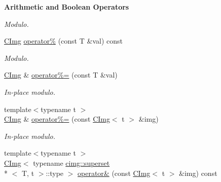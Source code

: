 \begin{Indent}{\bf Arithmetic and Boolean Operators}
\begin{DoxyCompactItemize}
\begin{DoxyCompactList}\small\item\em Modulo. \end{DoxyCompactList}\item 
\hypertarget{structcimg__library_1_1_c_img_aafbc4f1ab811546a85364618608eebfc}{\hyperlink{structcimg__library_1_1_c_img}{C\-Img} \hyperlink{structcimg__library_1_1_c_img_aafbc4f1ab811546a85364618608eebfc}{operator\%} (const T \&val) const }\label{structcimg__library_1_1_c_img_aafbc4f1ab811546a85364618608eebfc}

\begin{DoxyCompactList}\small\item\em Modulo. \end{DoxyCompactList}\item 
\hypertarget{structcimg__library_1_1_c_img_ac44cf1f894565de9abc1cc4b9c079d81}{\hyperlink{structcimg__library_1_1_c_img}{C\-Img} \& \hyperlink{structcimg__library_1_1_c_img_ac44cf1f894565de9abc1cc4b9c079d81}{operator\%=} (const T \&val)}\label{structcimg__library_1_1_c_img_ac44cf1f894565de9abc1cc4b9c079d81}

\begin{DoxyCompactList}\small\item\em In-\/place modulo. \end{DoxyCompactList}\item 
\hypertarget{structcimg__library_1_1_c_img_a5e695c9e7d106d52be64f935942c0d8c}{{\footnotesize template$<$typename t $>$ }\\\hyperlink{structcimg__library_1_1_c_img}{C\-Img} \& \hyperlink{structcimg__library_1_1_c_img_a5e695c9e7d106d52be64f935942c0d8c}{operator\%=} (const \hyperlink{structcimg__library_1_1_c_img}{C\-Img}$<$ t $>$ \&img)}\label{structcimg__library_1_1_c_img_a5e695c9e7d106d52be64f935942c0d8c}

\begin{DoxyCompactList}\small\item\em In-\/place modulo. \end{DoxyCompactList}\item 
\hypertarget{structcimg__library_1_1_c_img_a20d649ff6513175f16bf436eac9159f1}{{\footnotesize template$<$typename t $>$ }\\\hyperlink{structcimg__library_1_1_c_img}{C\-Img}$<$ typename \hyperlink{structcimg__library_1_1cimg_1_1superset}{cimg\-::superset}\\*
$<$ T, t $>$\-::type $>$ \hyperlink{structcimg__library_1_1_c_img_a20d649ff6513175f16bf436eac9159f1}{operator\&} (const \hyperlink{structcimg__library_1_1_c_img}{C\-Img}$<$ t $>$ \&img) const }\label{structcimg__library_1_1_c_img_a20d649ff6513175f16bf436eac9159f1}


\end{DoxyCompactItemize}
\end{Indent}
